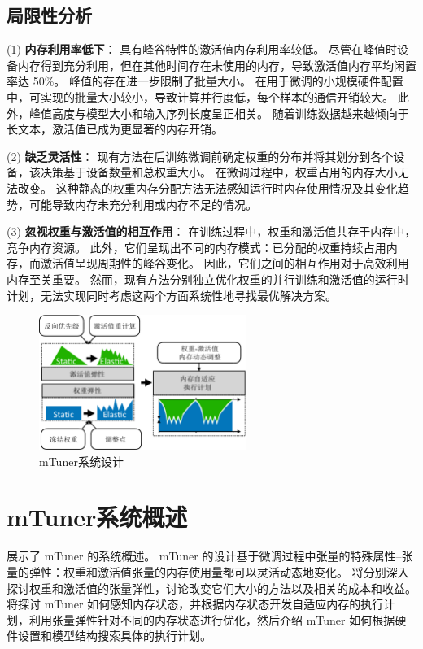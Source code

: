 \subsection{局限性分析}

(1) \textbf{内存利用率低下}：
具有峰谷特性的激活值内存利用率较低。
尽管在峰值时设备内存得到充分利用，但在其他时间存在未使用的内存，导致激活值内存平均闲置率达 50\%。
峰值的存在进一步限制了批量大小。
在用于微调的小规模硬件配置中，可实现的批量大小较小，导致计算并行度低，每个样本的通信开销较大。
此外，峰值高度与模型大小和输入序列长度呈正相关。
随着训练数据越来越倾向于长文本，激活值已成为更显著的内存开销。

(2) \textbf{缺乏灵活性}：
现有方法在后训练微调前确定权重的分布并将其划分到各个设备，该决策基于设备数量和总权重大小。
在微调过程中，权重占用的内存大小无法改变。
这种静态的权重内存分配方法无法感知运行时内存使用情况及其变化趋势，可能导致内存未充分利用或内存不足的情况。

(3) \textbf{忽视权重与激活值的相互作用}：
在训练过程中，权重和激活值共存于内存中，竞争内存资源。
此外，它们呈现出不同的内存模式：已分配的权重持续占用内存，而激活值呈现周期性的峰谷变化。
因此，它们之间的相互作用对于高效利用内存至关重要。
然而，现有方法分别独立优化权重的并行训练和激活值的运行时计划，无法实现同时考虑这两个方面系统性地寻找最优解决方案。

\begin{figure}[ht]
\centerline{\includegraphics[width=0.6\textwidth]{figures/mtuner/overview-crop.pdf}}
\caption{mTuner系统设计}
\label{fig:mtuner-overview}
\end{figure}

\section{mTuner系统概述}
展示了 mTuner 的系统概述。
mTuner 的设计基于微调过程中张量的特殊属性--张量的弹性：权重和激活值张量的内存使用量都可以灵活动态地变化。
将分别深入探讨权重和激活值的张量弹性，讨论改变它们大小的方法以及相关的成本和收益。
将探讨 mTuner 如何感知内存状态，并根据内存状态开发自适应内存的执行计划，利用张量弹性针对不同的内存状态进行优化，然后介绍 mTuner 如何根据硬件设置和模型结构搜索具体的执行计划。


